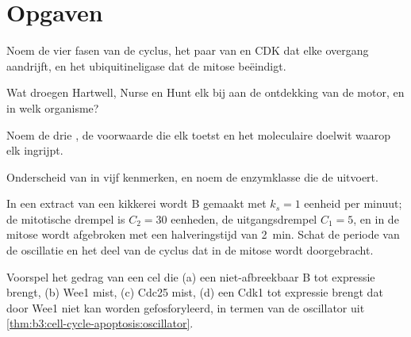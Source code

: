 \section{Opgaven}

\begin{exercise}[$\star$]\label{exo:b3:cell-cycle-apoptosis:1}
Noem de vier fasen van de cyclus, het paar van  en CDK dat elke
overgang aandrijft, en het ubiquitineligase dat de mitose beëindigt.
\end{exercise}

\begin{exercise}[$\star$]\label{exo:b3:cell-cycle-apoptosis:2}
Wat droegen Hartwell, Nurse en Hunt elk bij aan de ontdekking van de
motor, en in welk organisme?
\end{exercise}

\begin{exercise}[$\star$]\label{exo:b3:cell-cycle-apoptosis:3}
Noem de drie , de voorwaarde die elk toetst en het
moleculaire doelwit waarop elk ingrijpt.
\end{exercise}

\begin{exercise}[$\star$]\label{exo:b3:cell-cycle-apoptosis:4}
Onderscheid  van  in vijf kenmerken, en noem de
enzymklasse die de  uitvoert.
\end{exercise}

\begin{exercise}[$\star\star$]\label{exo:b3:cell-cycle-apoptosis:5}
In een extract van een kikkerei wordt  B gemaakt met
$k_{s} = 1$ eenheid per minuut; de mitotische drempel is
$C_{2} = 30$ eenheden, de uitgangsdrempel $C_{1} = 5$, en in de mitose
wordt  afgebroken met een halveringstijd van \qty{2}{min}. Schat
de periode van de oscillatie en het deel van de cyclus dat in de mitose
wordt doorgebracht.
\end{exercise}

\begin{exercise}[$\star\star$]\label{exo:b3:cell-cycle-apoptosis:6}
Voorspel het gedrag van een cel die (a) een niet-afbreekbaar  B
tot expressie brengt, (b) Wee1 mist, (c) Cdc25 mist, (d) een Cdk1 tot
expressie brengt dat door Wee1 niet kan worden gefosforyleerd, in
termen van de oscillator uit
\cref{thm:b3:cell-cycle-apoptosis:oscillator}.
\end{exercise}

